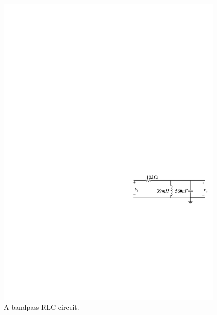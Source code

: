\documentclass[11pt]{article}
\begin{document}
\begin{question}


    \begin{figure}[H]
        \centering
        \includegraphics[scale=1.2,angle=0]{Fig/cir4.pdf}
        \caption{A bandpass RLC circuit.} \label{fig:cir4}
    \end{figure}


\end{question}
\end{document}
